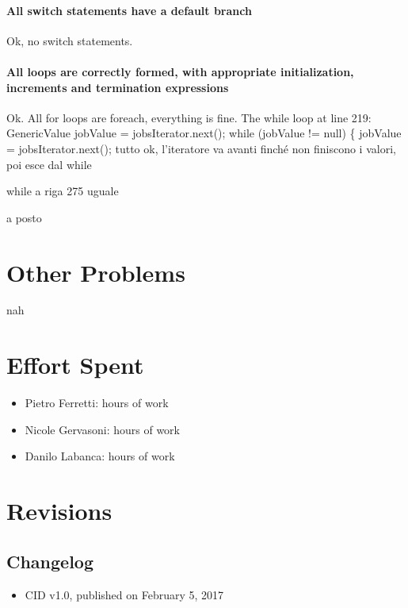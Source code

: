 \documentclass[english]{article}
\begin{document}
\paragraph{All switch statements have a default branch}
Ok, no switch statements.

\paragraph{All loops are correctly formed, with appropriate initialization, increments and termination expressions}
Ok.
All for loops are foreach, everything is fine.
The while loop at line 219:
GenericValue jobValue = jobsIterator.next();
while (jobValue != null) \{
jobValue = jobsIterator.next();
tutto ok, l'iteratore va avanti finché non finiscono i valori, poi esce dal while

while a riga 275 uguale

a posto

\section{Other Problems} %
nah

\section{Effort Spent}
\begin{itemize}
	\item{Pietro Ferretti:  hours of work}
	\item{Nicole Gervasoni:  hours of work}
	\item{Danilo Labanca:  hours of work}
\end{itemize}


\section{Revisions}

\subsection{Changelog}
\begin{itemize}
	\item{CID v1.0, published on February 5, 2017}
\end{itemize}
\end{document}
